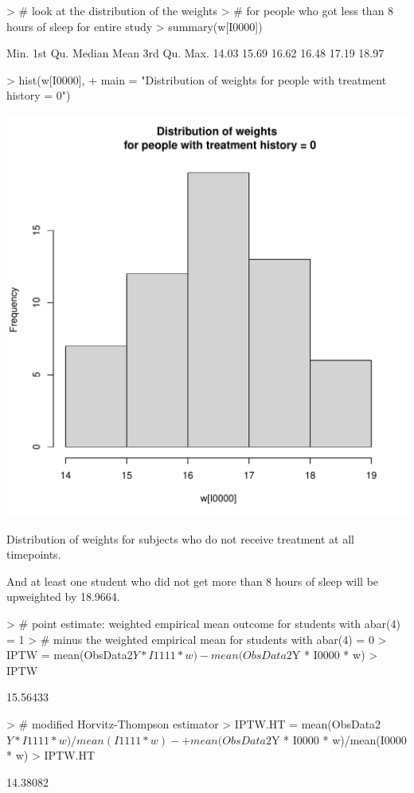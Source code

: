 \documentclass{exam}
\newenvironment{myfigure}{\captionsetup{type=mytype}}{}
\begin{document}
\begin{enumerate}
\begin{solution}
\begin{Schunk}
\begin{Sinput}
> # look at the distribution of the weights 
> # for people who got less than 8 hours of sleep for entire study
> summary(w[I0000])
\end{Sinput}
\begin{Soutput}
   Min. 1st Qu.  Median    Mean 3rd Qu.    Max. 
  14.03   15.69   16.62   16.48   17.19   18.97 
\end{Soutput}
\begin{Sinput}
> hist(w[I0000], 
+      main = "Distribution of weights \n for people with treatment history = 0")
\end{Sinput}
\end{Schunk}
\begin{myfigure}
\begin{center}
\includegraphics[width=.4\textwidth]{w0000Hist2.pdf}
\caption{Distribution of weights for subjects who do not receive treatment at all timepoints.}
\label{Fig:w0000Hist2}
\end{center}
\end{myfigure}

And at least one student who did not get more than 8 hours of sleep will be upweighted by 18.9664.


\begin{Schunk}
\begin{Sinput}
> # point estimate: weighted empirical mean outcome for students with abar(4) = 1 
> # minus the weighted empirical mean for students with abar(4) = 0 
> IPTW = mean(ObsData2$Y * I1111 * w) - mean(ObsData2$Y * I0000 * w)
> IPTW
\end{Sinput}
\begin{Soutput}
[1] 15.56433
\end{Soutput}
\end{Schunk}


\begin{Schunk}
\begin{Sinput}
> # modified Horvitz-Thompson estimator
> IPTW.HT = mean(ObsData2$Y * I1111 * w)/mean(I1111 * w) - 
+   mean(ObsData2$Y * I0000 * w)/mean(I0000 * w)
> IPTW.HT
\end{Sinput}
\begin{Soutput}
[1] 14.38082
\end{Soutput}
\end{Schunk}


\end{solution}
\end{enumerate}
\end{document}

